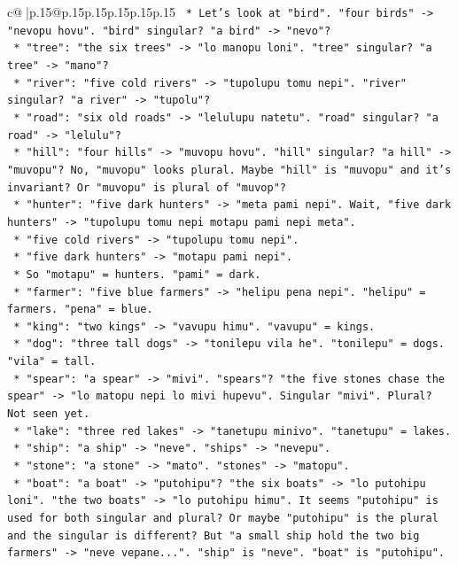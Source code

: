 \documentclass{article}
\begin{document}
{\begin{supertabular}{c@{$\;$}|p{.15\linewidth}@{}p{.15\linewidth}p{.15\linewidth}p{.15\linewidth}p{.15\linewidth}p{.15\linewidth}}
{{{\texttt{    *   Let's look at "bird". "four birds" {-}> "nevopu hovu". "bird" singular? "a bird" {-}> "nevo"?} \\
\texttt{    *   "tree": "the six trees" {-}> "lo manopu loni". "tree" singular? "a tree" {-}> "mano"?} \\
\texttt{    *   "river": "five cold rivers" {-}> "tupolupu tomu nepi". "river" singular? "a river" {-}> "tupolu"?} \\
\texttt{    *   "road": "six old roads" {-}> "lelulupu natetu". "road" singular? "a road" {-}> "lelulu"?} \\
\texttt{    *   "hill": "four hills" {-}> "muvopu hovu". "hill" singular? "a hill" {-}> "muvopu"? No, "muvopu" looks plural. Maybe "hill" is "muvopu" and it's invariant? Or "muvopu" is plural of "muvop"?} \\
\texttt{    *   "hunter": "five dark hunters" {-}> "meta pami nepi". Wait, "five dark hunters" {-}> "tupolupu tomu nepi motapu pami nepi meta".} \\
\texttt{        *   "five cold rivers" {-}> "tupolupu tomu nepi".} \\
\texttt{        *   "five dark hunters" {-}> "motapu pami nepi".} \\
\texttt{        *   So "motapu" = hunters. "pami" = dark.} \\
\texttt{    *   "farmer": "five blue farmers" {-}> "helipu pena nepi". "helipu" = farmers. "pena" = blue.} \\
\texttt{    *   "king": "two kings" {-}> "vavupu himu". "vavupu" = kings.} \\
\texttt{    *   "dog": "three tall dogs" {-}> "tonilepu vila he". "tonilepu" = dogs. "vila" = tall.} \\
\texttt{    *   "spear": "a spear" {-}> "mivi". "spears"? "the five stones chase the spear" {-}> "lo matopu nepi lo mivi hupevu". Singular "mivi". Plural? Not seen yet.} \\
\texttt{    *   "lake": "three red lakes" {-}> "tanetupu minivo". "tanetupu" = lakes.} \\
\texttt{    *   "ship": "a ship" {-}> "neve". "ships" {-}> "nevepu".} \\
\texttt{    *   "stone": "a stone" {-}> "mato". "stones" {-}> "matopu".} \\
\texttt{    *   "boat": "a boat" {-}> "putohipu"? "the six boats" {-}> "lo putohipu loni". "the two boats" {-}> "lo putohipu himu". It seems "putohipu" is used for both singular and plural? Or maybe "putohipu" is the plural and the singular is different? But "a small ship hold the two big farmers" {-}> "neve vepane...". "ship" is "neve". "boat" is "putohipu".} \\
}}}
\end{supertabular}}
\end{document}
